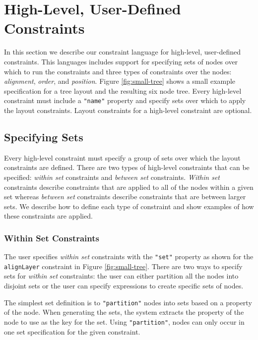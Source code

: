 \section{High-Level, User-Defined Constraints}
\smallTree
In this section we describe our constraint language for high-level, user-defined constraints. This languages includes support for specifying sets of nodes over which to run the constraints and three types of constraints over the nodes: \emph{alignment}, \emph{order}, and \emph{position}. Figure \ref{fig:small-tree} shows a small example specification for a tree layout and the resulting six node tree. Every high-level constraint must include a \texttt{"name"} property and specify sets over which to apply the layout constraints. Layout constraints for a high-level constraint are optional.

\subsection{Specifying Sets}
Every high-level constraint must specify a group of sets over which the layout constraints are defined. There are two types of high-level constraints that can be specified: \emph{within set} constraints and \emph{between set} constraints. \emph{Within set} constraints describe constraints that are applied to all of the nodes within a given set whereas \emph{between set} constraints describe constraints that are between larger sets. We describe how to define each type of constraint and show examples of how these constraints are applied.

\subsubsection{Within Set Constraints}
The user specifies \emph{within set} constraints with the \texttt{"set"} property as shown for the \texttt{alignLayer} constraint in Figure \ref{fig:small-tree}. There are two ways to specify sets for \emph{within set} constraints: the user can either partition all the nodes into disjoint sets or the user can specify expressions to create specific sets of nodes.

The simplest set definition is to \texttt{"partition"} nodes into sets based on a property of the node. When generating the sets, the system extracts the property of the node to use as the key for the set. Using \texttt{"partition"}, nodes can only occur in one set specification for the given constraint.

